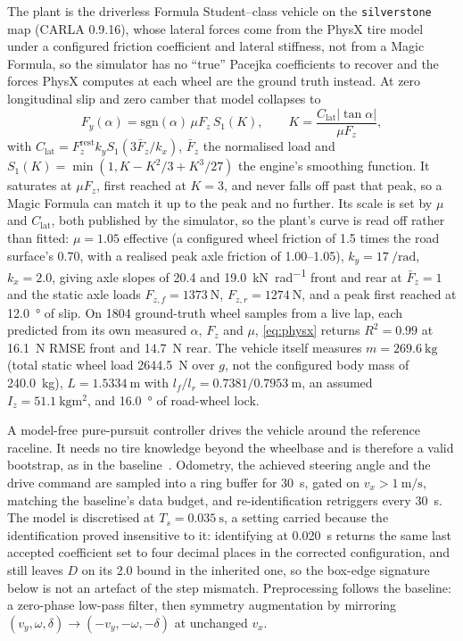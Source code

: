 The plant is the driverless Formula Student--class vehicle on the
\texttt{silverstone} map (CARLA 0.9.16), whose lateral forces come from the
PhysX tire model~\cite{physxvehicle} under a configured friction coefficient
and lateral stiffness, not from a Magic Formula, so the simulator has no
``true'' Pacejka coefficients to recover and the forces PhysX computes at each
wheel are the ground truth instead. At zero longitudinal slip and zero camber
that model collapses to
\begin{equation}
F_{y}(\alpha)=\mathrm{sgn}(\alpha)\,\mu F_{z}\,S_{1}(K),\qquad
K=\frac{C_{\mathrm{lat}}|\tan\alpha|}{\mu F_{z}},
\label{eq:physx}
\end{equation}
with $C_{\mathrm{lat}}=F_{z}^{\mathrm{rest}}k_{y}S_{1}(3\bar F_{z}/k_{x})$,
$\bar F_{z}$ the normalised load and $S_{1}(K)=\min(1,K-K^{2}/3+K^{3}/27)$ the
engine's smoothing function. It saturates at $\mu F_{z}$, first reached at $K=3$, and never falls off past
that peak, so a Magic Formula can match it up to the peak and no further. Its
scale is set by $\mu$ and $C_{\mathrm{lat}}$, both published by the simulator,
so the plant's curve is read off rather than fitted: $\mu=\num{1.05}$ effective
(a configured wheel friction of \num{1.5} times the road surface's \num{0.70},
with a realised peak axle friction of \numrange{1.00}{1.05}),
$k_{y}=\SI{17}{\per \radian}$, $k_{x}=\num{2.0}$, giving axle slopes of
\num{20.4} and
\SI{19.0}{\kilo\newton\per\radian} front and rear at $\bar F_{z}=1$ and the
static axle loads $F_{z,f}=\SI{1373}{\newton}$, $F_{z,r}=\SI{1274}{\newton}$,
and a peak first reached at \SI{12.0}{\degree} of slip. On 1804 ground-truth
wheel samples from a live lap, each predicted from its own measured $\alpha$,
$F_{z}$ and $\mu$, \eqref{eq:physx} returns $R^{2}=\num{0.99}$ at
\SI{16.1}{\newton} RMSE front and \SI{14.7}{\newton} rear. The vehicle itself
measures $m=\SI{269.6}{\kilo\gram}$ (total static wheel load
\SI{2644.5}{\newton} over $g$, not the configured body mass of
\SI{240.0}{\kilo\gram}), $L=\SI{1.5334}{\meter}$ with
$l_{f}/l_{r}=\num{0.7381}/\SI{0.7953}{\meter}$, an assumed
$I_{z}=\SI{51.1}{\kilo\gram\meter\squared}$, and \SI{16.0}{\degree} of
road-wheel lock.



A model-free pure-pursuit controller drives the vehicle around the reference
raceline. It needs no tire knowledge beyond the wheelbase and is therefore a
valid bootstrap, as in the baseline~\cite{ontrack2025}. Odometry, the achieved
steering angle and the drive command are sampled into a ring buffer for
\SI{30}{\second}, gated on $v_{x}>\SI{1}{\meter\per\second}$, matching the
baseline's data budget, and re-identification retriggers every
\SI{30}{\second}. The model is discretised at $T_{s}=\SI{0.035}{\second}$, a
setting carried because the identification proved insensitive to it:
identifying at \SI{0.020}{\second} returns the same last accepted coefficient
set to four decimal places in the corrected configuration, and still leaves $D$
on its \num{2.0} bound in the inherited one, so the box-edge signature below is
not an artefact of the step mismatch. Preprocessing follows the baseline: a
zero-phase low-pass filter, then symmetry augmentation by mirroring
$(v_{y},\omega,\delta)\rightarrow(-v_{y},-\omega,-\delta)$ at unchanged
$v_{x}$.

